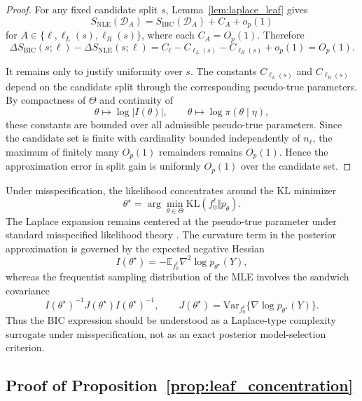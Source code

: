 \begin{proof}
For any fixed candidate split $s$,
Lemma~\ref{lem:laplace_leaf} gives
\[
S_{\mathrm{NLE}}(\mathcal{D}_A)
=
S_{\mathrm{BIC}}(\mathcal{D}_A)
+
C_A
+
o_p(1)
\]
for $A\in\{\ell,\ell_L(s),\ell_R(s)\}$, where each $C_A=O_p(1)$.
Therefore
\[
\Delta S_{\mathrm{BIC}}(s;\ell)
-
\Delta S_{\mathrm{NLE}}(s;\ell)
=
C_\ell
-
C_{\ell_L(s)}
-
C_{\ell_R(s)}
+
o_p(1)
=
O_p(1).
\]

It remains only to justify uniformity over $s$.
The constants $C_{\ell_L(s)}$ and $C_{\ell_R(s)}$ depend on the candidate split through the corresponding pseudo-true parameters.
By compactness of $\Theta$ and continuity of
\[
\theta \mapsto \log |I(\theta)|,
\qquad
\theta \mapsto \log \pi(\theta\mid\eta),
\]
these constants are bounded over all admissible pseudo-true parameters.
Since the candidate set is finite with cardinality bounded independently of $n_\ell$, the maximum of finitely many $O_p(1)$ remainders remains $O_p(1)$.
Hence the approximation error in split gain is uniformly $O_p(1)$ over the candidate set.
\end{proof}

\begin{remark}[Misspecification]
Under misspecification, the likelihood concentrates around the KL minimizer
\[
\theta^\star
=
\arg\min_{\theta\in\Theta}
\mathrm{KL}(f_0^\ell\Vert p_\theta).
\]
The Laplace expansion remains centered at the pseudo-true parameter under standard misspecified likelihood theory \citep{white1982maximum,kleijn2012bernstein}. The curvature term in the posterior approximation is governed by the expected negative Hessian
\[
I(\theta^\star)
=
-\mathbb{E}_{f_0^\ell}
\nabla^2\log p_{\theta^\star}(Y),
\]
whereas the frequentist sampling distribution of the MLE involves the sandwich covariance
\[
I(\theta^\star)^{-1}
J(\theta^\star)
I(\theta^\star)^{-1},
\qquad
J(\theta^\star)
=
\mathrm{Var}_{f_0^\ell}
\{\nabla\log p_{\theta^\star}(Y)\}.
\]
Thus the BIC expression should be understood as a Laplace-type complexity surrogate under misspecification, not as an exact posterior model-selection criterion.
\end{remark}


\subsection{Proof of Proposition~\ref{prop:leaf_concentration}}
\label{app:proof_leaf_concentration}

